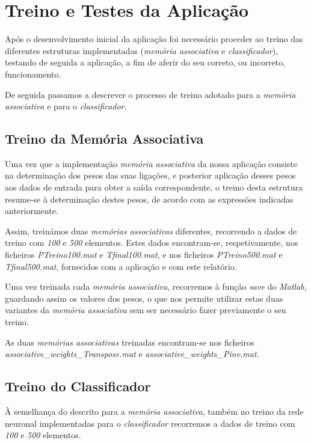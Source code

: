 \documentclass{article}
\begin{document}
\pagebreak

\section{Treino e Testes da Aplicação}

Após o desenvolvimento inicial da aplicação foi necessário proceder ao treino das diferentes estruturas implementadas (\emph{memória associativa} e \emph{classificador}), testando de seguida a aplicação, a fim de aferir do seu correto, ou incorreto, funcionamento.

De seguida passamos a descrever o processo de treino adotado para a \emph{memória associativa} e para o \emph{classificador}.

\subsection{Treino da Memória Associativa}

Uma vez que a implementação \emph{memória associativa} da nossa aplicação consiste na determinação dos pesos das suas ligações, e posterior aplicação desses pesos aos dados de entrada para obter a saída correspondente, o treino desta estrutura resume-se à determinação destes pesos, de acordo com as expressões indicadas anteriormente.

Assim, treinámos duas \emph{memórias associativas} diferentes, recorrendo a dados de treino com \emph{100} e \emph{500} elementos. Estes dados encontram-se, respetivamente, nos ficheiros \emph{PTreino100.mat} e \emph{Tfinal100.mat}, e nos ficheiros \emph{PTreino500.mat} e \emph{Tfinal500.mat}, fornecidos com a aplicação e com este relatório.

Uma vez treinada cada \emph{memória associativa}, recorremos à função \emph{save} do \emph{Matlab}, guardando assim os valores dos pesos, o que nos permite utilizar estas duas variantes da \emph{memória associativa} sem ser necessário fazer previamente o seu treino.

As duas \emph{memórias associativas} treinadas encontram-se nos ficheiros \emph{associative\_weights\_Transpose.mat} e \emph{associative\_weights\_Pinv.mat}.

\subsection{Treino do Classificador}

À semelhança do descrito para a \emph{memória associativa}, também no treino da rede neuronal implementadas para o \emph{classificador} recorremos a dados de treino com \emph{100} e \emph{500} elementos.
\end{document}
